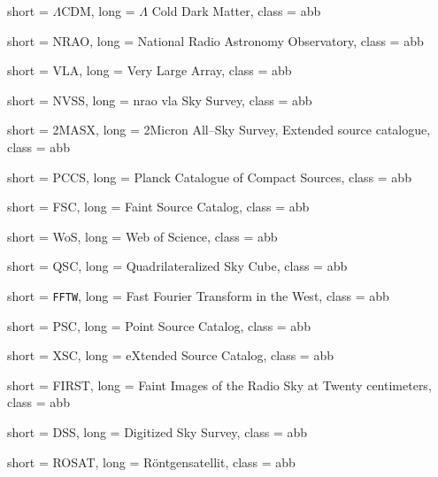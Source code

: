  {
    short = $\Lambda$CDM,
    long = $\Lambda$ Cold Dark Matter,
    class = abb
}
\providecommand{\lcdm}{\acs{lcdm}\xspace}

\providecommand{\smhw} {\ac{smhw}\xspace}

 {
    short = NRAO,
    long = National Radio Astronomy Observatory,
    class = abb
}
\providecommand{\nrao}{\ac{nrao}\xspace}

 {
    short = VLA,
    long = Very Large Array,
    class = abb
}
\providecommand{\vla}{\ac{vla}\xspace}

 {
    short = NVSS,
    long = \acs{nrao} \acs{vla} Sky Survey,
    class = abb
}
\providecommand{\nvss}{\acs{nvss}\xspace}

 {
    short = 2MASX,
    long = {2Micron All--Sky Survey, Extended source catalogue},
    class = abb
}
\providecommand{\masx}{\acs{masx}\xspace}

 {
    short = PCCS,
    long = Planck Catalogue of Compact Sources,
    class = abb
}
\providecommand{\pccs}{\ac{pccs}\xspace}

 {
    short = FSC,
    long = Faint Source Catalog,
    class = abb
}
\providecommand{\fsc}{\ac{fsc}\xspace}

 {
    short = WoS,
    long = Web of Science,
    class = abb
}

 {
    short = QSC,
    long = Quadrilateralized Sky Cube,
    class = abb
}

 {
    short = \texttt{FFTW},
    long = Fast Fourier Transform in the West,
    class = abb
}

 {
    short = PSC,
    long = Point Source Catalog,
    class = abb
}

 {
    short = XSC,
    long = eXtended Source Catalog,
    class = abb
}

 {
    short = FIRST,
    long =  Faint Images of the Radio Sky at Twenty centimeters,
    class = abb
}
\providecommand{\first}{\acs{first}\xspace}

 {
    short = DSS,
    long = Digitized Sky Survey,
    class = abb
}

 {
    short = ROSAT,
    long = {R\"ontgensatellit},
    class = abb
}

